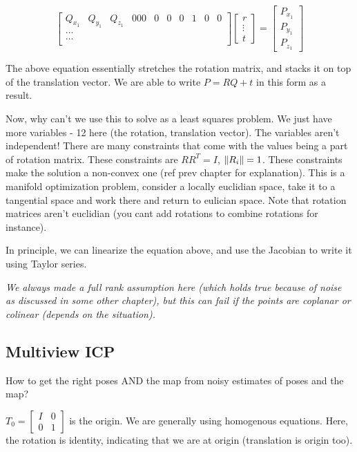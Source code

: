 \begin{equation}
    \begin{bmatrix}Q_{x_1} & Q_{y_1} & Q_{z_1} & 000 & 0 & 0 & 0 & 1 & 0 & 0 \\
    \hdots \\
    \hdots \\
    \end{bmatrix} \begin{bmatrix}r \\ \vdots \\ t\end{bmatrix} = \begin{bmatrix}P_{x_1} \\ P_{y_1} \\ P_{z_1}\end{bmatrix}
\end{equation}

The above equation essentially stretches the rotation matrix, and stacks it on top of the translation vector. We are able to write $P = RQ + t$ in this form as a result. 

Now, why can't we use this to solve as a least squares problem. We just have more variables - 12 here (the rotation, translation vector). The variables aren't independent! There are many constraints that come with the values being a part of rotation matrix. These constraints are $RR^T=I$, $\left\lVert R_i\right\rVert=1$. These constraints make the solution a non-convex one (ref prev chapter for explanation). This is a manifold optimization problem, consider a locally euclidian space, take it to a tangential space and work there and return to eulician space. Note that rotation matrices aren't euclidian (you cant add rotations to combine rotations for instance). 

In principle, we can linearize the equation above, and use the Jacobian to write it using Taylor series. 

\textit{We always made a full rank assumption here (which holds true because of noise as discussed in some other chapter), but this can fail if the points are coplanar or colinear (depends on the situation).}

\subsection{Multiview ICP}

How to get the right poses AND the map from noisy estimates of poses and the map? 

$T_0 = \begin{bmatrix}I & 0 \\ 0 & 1\end{bmatrix}$ is the origin. We are generally using homogenous equations. Here, the rotation is identity, indicating that we are at origin (translation is origin too). 

